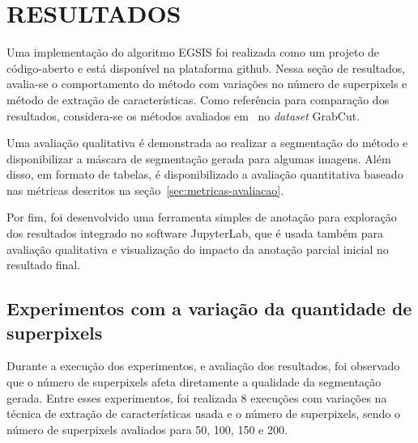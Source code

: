 \chapter{RESULTADOS}\label{chap:resultados}

Uma implementação do algoritmo EGSIS foi realizada como um projeto de
código-aberto e está disponível na plataforma
github\footnotemark. Nessa seção de resultados, avalia-se o
comportamento do método com variações no número de superpixels e
método de extração de características. Como referência para comparação
dos resultados, considera-se os métodos avaliados
em~\cite{wang2023review} no \textit{dataset} GrabCut.


Uma avaliação qualitativa é demonstrada ao realizar a segmentação do
método e disponibilizar a máscara de segmentação gerada para algumas
imagens. Além disso, em formato de tabelas, é disponibilizado a
avaliação quantitativa baseado nas métricas descritos na
seção~\ref{sec:metricas-avaliacao}.

Por fim, foi desenvolvido uma ferramenta simples de anotação para
exploração dos resultados integrado no software
JupyterLab\footnotemark, que é usada também para avaliação qualitativa
e visualização do impacto da anotação parcial inicial no resultado
final.


\section{Experimentos com a variação da quantidade de superpixels}\label{sec:variacao-superpixels}

Durante a execução dos experimentos, e avaliação dos resultados, foi
observado que o número de superpixels afeta diretamente a qualidade da
segmentação gerada. Entre esses experimentos, foi realizada 8
execuções com variações na técnica de extração de características
usada e o número de superpixels, sendo o número de superpixels
avaliados para 50, 100, 150 e 200.

